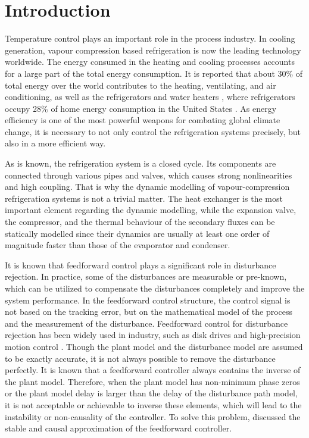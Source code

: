 \documentclass{ifacconf}
\begin{document}
\section{Introduction}
Temperature control plays an important role in the process industry. In cooling generation, vapour compression based refrigeration is now the leading technology worldwide. The energy consumed in the heating and cooling processes accounts for a large part of the total energy consumption. It is reported that about 30\% of total energy over the world contributes to the heating, ventilating, and air conditioning, as well as the refrigerators and water heaters \citep{Jahangeer2011}, where refrigerators occupy 28\% of home energy consumption in the United States \citep{steemers2009household}. As energy efficiency is one of the most powerful weapons for combating global climate change, it is necessary to not only control the refrigeration systems precisely, but also in a more efficient way.


As is known, the refrigeration system is a closed cycle. Its components are connected through various pipes and valves, which causes strong nonlinearities and high coupling. That is why the dynamic modelling of vapour-compression refrigeration systems is not a trivial matter. The heat exchanger is the most important element regarding the dynamic modelling, while the expansion valve, the compressor, and the thermal behaviour of the secondary fluxes can be statically modelled since their dynamics are usually at least one order of magnitude faster than those of the evaporator and condenser.

It is known that feedforward control plays a significant role in disturbance rejection. In practice, some of the disturbances are measurable or pre-known, which can be utilized to compensate the disturbances completely and improve the system performance. In the feedforward control structure, the control signal is not based on the tracking error, but on the mathematical model of the process and the measurement of the disturbance. Feedforward control for disturbance rejection has been widely used in industry, such as disk drives \citep{Jahangeer2011} and high-precision motion control \citep{su2004disturbance}. Though the plant model and the disturbance model are assumed to be exactly accurate, it is not always possible to remove the disturbance perfectly. It is known that a feedforward controller always contains the inverse of the plant model. Therefore, when the plant model has non-minimum phase zeros or the plant model delay is larger than the delay of the disturbance path model, it is not acceptable or achievable to inverse these elements, which will lead to the instability or non-causality of the controller. To solve this problem, \cite{zhong2012feedforward} discussed the stable and causal approximation of the feedforward controller.
\end{document}

